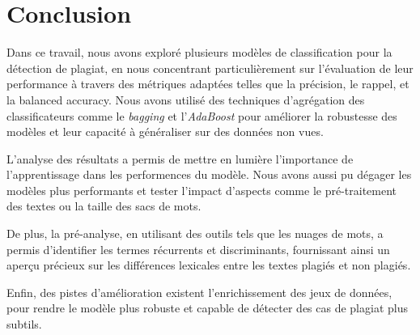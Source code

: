 \section{Conclusion}

Dans ce travail, nous avons exploré plusieurs modèles de classification pour la détection de plagiat, en nous concentrant particulièrement sur l'évaluation de leur performance à travers des métriques adaptées telles que la précision, le rappel, et la balanced accuracy. Nous avons utilisé des techniques d'agrégation des classificateurs comme le \textit{bagging} et l'\textit{AdaBoost} pour améliorer la robustesse des modèles et leur capacité à généraliser sur des données non vues.

L’analyse des résultats a permis de mettre en lumière l'importance de l'apprentissage dans les performences du modèle. Nous avons aussi pu dégager les modèles plus performants et tester l'impact d'aspects comme le pré-traitement des textes ou la taille des sacs de mots.

De plus, la pré-analyse, en utilisant des outils tels que les nuages de mots, a permis d'identifier les termes récurrents et discriminants, fournissant ainsi un aperçu précieux sur les différences lexicales entre les textes plagiés et non plagiés.

Enfin, des pistes d'amélioration existent l'enrichissement des jeux de données, pour rendre le modèle plus robuste et capable de détecter des cas de plagiat plus subtils.
